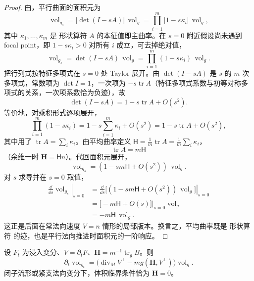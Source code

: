 \begin{proof}
由，平行曲面的面积元为
\begin{equation*}
\operatorname{vol}_{g_s}=|\det(I-sA)|\,\operatorname{vol}_g
=\prod_{i=1}^m|1-s\kappa_i|\,\operatorname{vol}_g,
\end{equation*}
其中 $\kappa_1,\ldots,\kappa_m$ 是 形状算符 $A$ 的本征值即主曲率。在 $s=0$ 附近假设尚未遇到 focal point，即 $1-s\kappa_i>0$ 对所有 $i$ 成立，可去掉绝对值，
\begin{equation*}
\operatorname{vol}_{g_s}=\det(I-sA)\,\operatorname{vol}_g
=\prod_{i=1}^m(1-s\kappa_i)\,\operatorname{vol}_g.
\end{equation*}
把行列式按特征多项式在 $s=0$ 处 Taylor 展开。由 $\det(I-sA)$ 是 $s$ 的 $m$ 次多项式，常数项为 $\det I=1$，一次项为 $-s\operatorname{tr}A$（特征多项式系数与初等对称多项式的关系，一次项系数恰为负迹），故
\begin{equation*}
\det(I-sA)=1-s\operatorname{tr}A+O(s^2).
\end{equation*}
等价地，对乘积形式逐项展开，
\begin{equation*}
\prod_{i=1}^m(1-s\kappa_i)
=1-s\sum_{i=1}^m\kappa_i+O(s^2)
=1-s\operatorname{tr}A+O(s^2),
\end{equation*}
其中用了 $\operatorname{tr}A=\sum_i\kappa_i$。由平均曲率定义 $\mathsf H=\frac1m\operatorname{tr}A=\frac1m\sum_i\kappa_i$，
\begin{equation*}
\operatorname{tr}A=m\mathsf H
\end{equation*}
（余维一时 $\mathbf H=\mathsf H n$）。代回面积元展开，
\begin{equation*}
\operatorname{vol}_{g_s}=(1-sm\mathsf H+O(s^2))\,\operatorname{vol}_g.
\end{equation*}
对 $s$ 求导并在 $s=0$ 取值，
\begin{align*}
\left.\frac{\dd}{\dd s}\operatorname{vol}_{g_s}\right|_{s=0}
&=\left.\frac{\dd}{\dd s}\bigl[(1-sm\mathsf H+O(s^2))\,\operatorname{vol}_g\bigr]\right|_{s=0}\\
&=\bigl[-m\mathsf H+O(s)\bigr]\Big|_{s=0}\operatorname{vol}_g\\
&=-m\mathsf H\,\operatorname{vol}_g.
\end{align*}
这正是后面在常法向速度 $V=n$ 情形的局部版本。换言之，平均曲率既是 形状算符 的迹，也是平行法向推进时面积元的一阶响应。
\end{proof}

\begin{proposition}[浸入体积的一阶变分]
设 $F_t$ 为浸入变分、$V=\partial_tF$、$\mathbf H=m^{-1}\operatorname{tr}_gB$。则\[\partial_t\operatorname{vol}_{g_t}=\bigl(\operatorname{div}_MV^\top-m\overline g(\mathbf H,V^\perp)\bigr)\operatorname{vol}_g.\]闭子流形或紧支法向变分下，体积临界条件恰为 $\mathbf H=0$。
\end{proposition}

